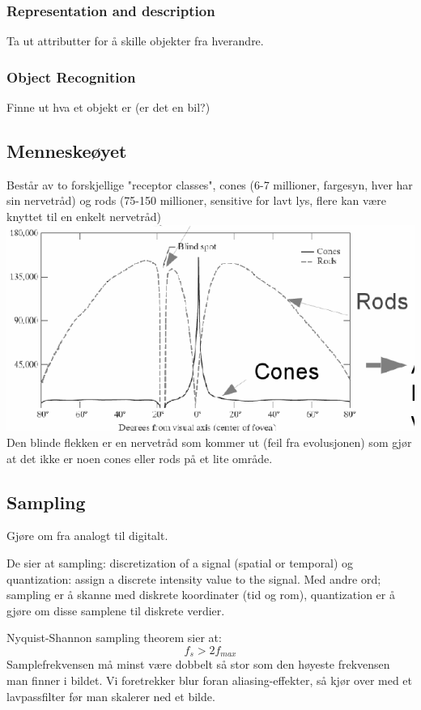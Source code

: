 \subsubsection{Representation and description}
Ta ut attributter for å skille objekter fra hverandre.

\subsubsection{Object Recognition}
Finne ut hva et objekt er (er det en bil?)

\subsection{Menneskeøyet}
Består av to forskjellige "receptor classes", cones (6-7 millioner, fargesyn, hver har sin nervetråd) og rods (75-150 millioner, sensitive for lavt lys, flere kan være knyttet til en enkelt nervetråd)
\\ \includegraphics[width=\textwidth]{Bilder/rodscones.png}
Den blinde flekken er en nervetråd som kommer ut (feil fra evolusjonen) som gjør at det ikke er noen cones eller rods på et lite område.

\subsection{Sampling}
Gjøre om fra analogt til digitalt. 

De sier at sampling: discretization of a signal (spatial or temporal) og quantization: assign a discrete intensity value to the signal. Med andre ord; sampling er å skanne med diskrete koordinater (tid og rom), quantization er å gjøre om disse samplene til diskrete verdier.

Nyquist-Shannon sampling theorem sier at:
\begin{equation}
    f_s > 2 f_{max}
\end{equation}
Samplefrekvensen må minst være dobbelt så stor som den høyeste frekvensen man finner i bildet. Vi foretrekker blur foran aliasing-effekter, så kjør over med et lavpassfilter før man skalerer ned et bilde.

